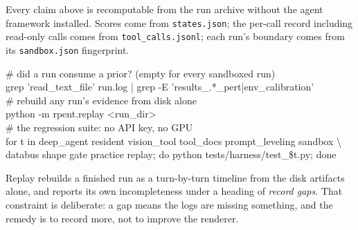 \documentclass[11pt,a4paper]{article}
\begin{document}
Every claim above is recomputable from the run archive without the agent
framework installed. Scores come from \texttt{states.json}; the per-call record
including read-only calls comes from \texttt{tool\_calls.jsonl}; each run's
boundary comes from its \texttt{sandbox.json} fingerprint.

\begin{evidence}[title={Checks}]
\ttfamily\footnotesize
\# did a run consume a prior?  (empty for every sandboxed run)\\
grep 'read\_text\_file' run.log | grep -E 'results\_.*\_pert|env\_calibration'\\[0.5em]
\# rebuild any run's evidence from disk alone\\
python -m rpent.replay \textless run\_dir\textgreater\\[0.5em]
\# the regression suite: no API key, no GPU\\
for t in deep\_agent resident vision\_tool tool\_docs prompt\_leveling sandbox \textbackslash\\
\hspace*{2.2em}databus shape gate practice replay; do python tests/harness/test\_\$t.py; done
\end{evidence}

\noindent
Replay rebuilds a finished run as a turn-by-turn timeline from the disk
artifacts alone, and reports its own incompleteness under a heading of
\emph{record gaps}. That constraint is deliberate: a gap means the logs are
missing something, and the remedy is to record more, not to improve the
renderer.
\end{document}
